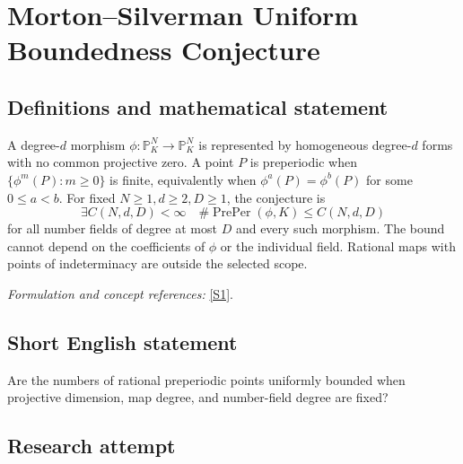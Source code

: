 \documentclass[11pt,a4paper]{article}
\newcommand{\PP}{\mathbb P}
\newcommand{\sref}[2]{\hyperlink{source:#1:#2}{[S#2]}}
\newif\ifshowcatalogue
\newcommand{\cataloguescope}[1]{\ifshowcatalogue
 \paragraph{Exact scope in the supplied catalogue.}
 \begin{quote}\small #1\end{quote}\fi}
\begin{document}
\setcounter{section}{0}
\clearpage
\section*{\texorpdfstring{Morton–Silverman Uniform Boundedness Conjecture}{Morton–Silverman Uniform Boundedness Conjecture}}\label{30006792}
\subsection{Definitions and mathematical statement}
A degree-$d$ morphism $\phi:\PP^N_K\to\PP^N_K$ is represented by homogeneous degree-$d$ forms with no common projective zero. A point $P$ is preperiodic when $\{\phi^m(P):m\ge0\}$ is finite, equivalently when $\phi^a(P)=\phi^b(P)$ for some $0\le a<b$. For fixed $N\ge1,d\ge2,D\ge1$, the conjecture is
\[
 \exists C(N,d,D)<\infty\quad
 \#\operatorname{PrePer}(\phi,K)\le C(N,d,D)
\]
for all number fields of degree at most $D$ and every such morphism. The bound cannot depend on the coefficients of $\phi$ or the individual field. Rational maps with points of indeterminacy are outside the selected scope.
\par\smallskip\textit{Formulation and concept references:} \sref{30006792}{1}.
\cataloguescope{For all fixed integers N>=1, d>=2 and D>=1, there exists a finite constant C(N,d,D) such that for every number field K with [K:Q]<=D and every degree-d K-morphism phi:P\textasciicircum{}N\_K->P\textasciicircum{}N\_K, the set of K-rational preperiodic points has cardinality at most C(N,d,D). A point is preperiodic when its forward orbit under phi is finite. The morphism is everywhere defined, equivalently given by homogeneous degree-d forms with no common projective zero. The bound is independent of the field and map except for N,d,D; no effective formula or classification is required.}
\subsection{Short English statement}
Are the numbers of rational preperiodic points uniformly bounded when projective dimension, map degree, and number-field degree are fixed?
\subsection{Research attempt}
\end{document}
